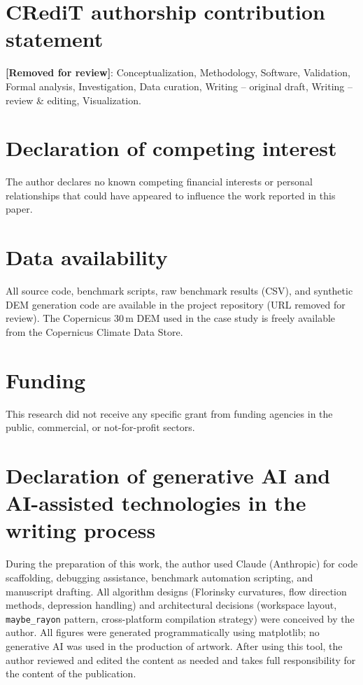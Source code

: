 \documentclass[preprint,review,12pt,authoryear]{elsarticle}
\begin{document}
\section*{CRediT authorship contribution statement}

\textbf{[Removed for review]}: Conceptualization, Methodology, Software, Validation, Formal analysis, Investigation, Data curation, Writing -- original draft, Writing -- review \& editing, Visualization.

\section*{Declaration of competing interest}

The author declares no known competing financial interests or personal relationships that could have appeared to influence the work reported in this paper.

\section*{Data availability}

All source code, benchmark scripts, raw benchmark results (CSV), and synthetic DEM generation code are available in the project repository (URL removed for review). The Copernicus 30\,m DEM used in the case study is freely available from the Copernicus Climate Data Store.

\section*{Funding}

This research did not receive any specific grant from funding agencies in the public, commercial, or not-for-profit sectors.

\section*{Declaration of generative AI and AI-assisted technologies in the writing process}

During the preparation of this work, the author used Claude (Anthropic) for code scaffolding, debugging assistance, benchmark automation scripting, and manuscript drafting. All algorithm designs (Florinsky curvatures, flow direction methods, depression handling) and architectural decisions (workspace layout, \texttt{maybe\_rayon} pattern, cross-platform compilation strategy) were conceived by the author. All figures were generated programmatically using matplotlib; no generative AI was used in the production of artwork. After using this tool, the author reviewed and edited the content as needed and takes full responsibility for the content of the publication.
\end{document}
